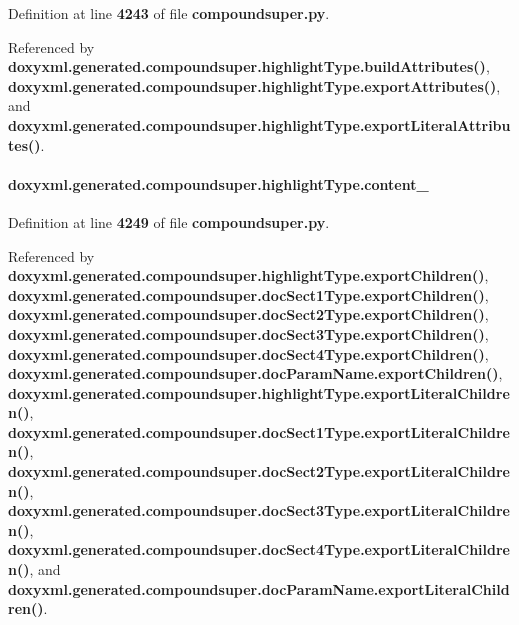 Definition at line {\bf 4243} of file {\bf compoundsuper.\+py}.



Referenced by {\bf doxyxml.\+generated.\+compoundsuper.\+highlight\+Type.\+build\+Attributes()}, {\bf doxyxml.\+generated.\+compoundsuper.\+highlight\+Type.\+export\+Attributes()}, and {\bf doxyxml.\+generated.\+compoundsuper.\+highlight\+Type.\+export\+Literal\+Attributes()}.

\paragraph[{content\+\_\+}]{\setlength{\rightskip}{0pt plus 5cm}doxyxml.\+generated.\+compoundsuper.\+highlight\+Type.\+content\+\_\+}\label{classdoxyxml_1_1generated_1_1compoundsuper_1_1highlightType_ae3d8ee2ce6ab8b9e41c2814740787c98}


Definition at line {\bf 4249} of file {\bf compoundsuper.\+py}.



Referenced by {\bf doxyxml.\+generated.\+compoundsuper.\+highlight\+Type.\+export\+Children()}, {\bf doxyxml.\+generated.\+compoundsuper.\+doc\+Sect1\+Type.\+export\+Children()}, {\bf doxyxml.\+generated.\+compoundsuper.\+doc\+Sect2\+Type.\+export\+Children()}, {\bf doxyxml.\+generated.\+compoundsuper.\+doc\+Sect3\+Type.\+export\+Children()}, {\bf doxyxml.\+generated.\+compoundsuper.\+doc\+Sect4\+Type.\+export\+Children()}, {\bf doxyxml.\+generated.\+compoundsuper.\+doc\+Param\+Name.\+export\+Children()}, {\bf doxyxml.\+generated.\+compoundsuper.\+highlight\+Type.\+export\+Literal\+Children()}, {\bf doxyxml.\+generated.\+compoundsuper.\+doc\+Sect1\+Type.\+export\+Literal\+Children()}, {\bf doxyxml.\+generated.\+compoundsuper.\+doc\+Sect2\+Type.\+export\+Literal\+Children()}, {\bf doxyxml.\+generated.\+compoundsuper.\+doc\+Sect3\+Type.\+export\+Literal\+Children()}, {\bf doxyxml.\+generated.\+compoundsuper.\+doc\+Sect4\+Type.\+export\+Literal\+Children()}, and {\bf doxyxml.\+generated.\+compoundsuper.\+doc\+Param\+Name.\+export\+Literal\+Children()}.

